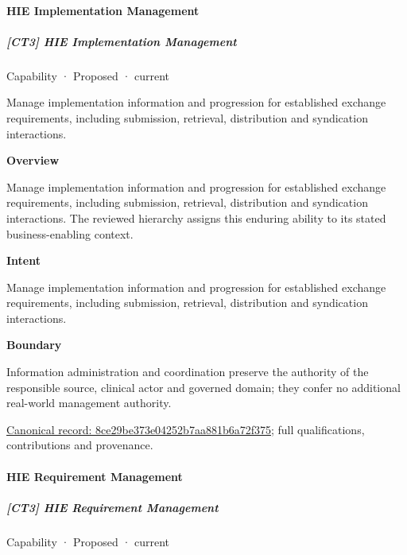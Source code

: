 \paragraph{HIE Implementation Management}

\subparagraph{[CT3] HIE Implementation Management}

\label{element:8ce29be373e04252b7aa881b6a72f375}
{\small Capability · Proposed · current}\par

Manage implementation information and progression for established exchange requirements, including submission, retrieval, distribution and syndication interactions.



\textbf{Overview}



Manage implementation information and progression for established exchange requirements, including submission, retrieval, distribution and syndication interactions. The reviewed hierarchy assigns this enduring ability to its stated business-enabling context.



\textbf{Intent}



Manage implementation information and progression for established exchange requirements, including submission, retrieval, distribution and syndication interactions.



\textbf{Boundary}



Information administration and coordination preserve the authority of the responsible source, clinical actor and governed domain; they confer no additional real-world management authority.


{\footnotesize \href{../../../../continuum/strategy/capability/8ce29be373e04252b7aa881b6a72f375.md}{Canonical record: 8ce29be373e04252b7aa881b6a72f375}; full qualifications, contributions and provenance.}\par
\paragraph{HIE Requirement Management}

\subparagraph{[CT3] HIE Requirement Management}

\label{element:1c852a1799984feba50011172983c865}
{\small Capability · Proposed · current}\par

